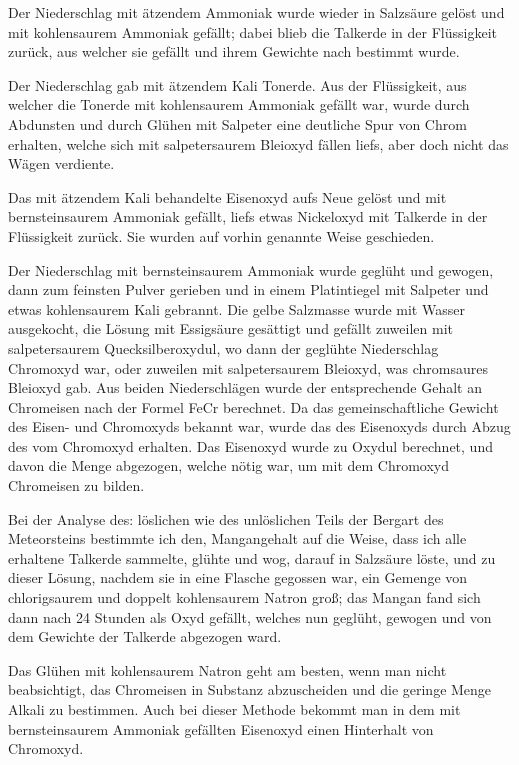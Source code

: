 \documentclass[a4paper, 11pt, oneside]{article}
\begin{document}
Der Niederschlag mit ätzendem Ammoniak wurde wieder in Salzsäure gelöst und mit kohlensaurem Ammoniak gefällt; dabei blieb die Talkerde in der Flüssigkeit zurück, aus welcher sie gefällt und ihrem Gewichte nach bestimmt wurde.

Der Niederschlag gab mit ätzendem Kali Tonerde. Aus der Flüssigkeit, aus welcher die Tonerde mit kohlensaurem Ammoniak gefällt war, wurde durch Abdunsten und durch Glühen mit Salpeter eine deutliche Spur von Chrom erhalten, welche sich mit salpetersaurem Bleioxyd fällen liefs, aber doch nicht das Wägen verdiente.

Das mit ätzendem Kali behandelte Eisenoxyd aufs Neue gelöst und mit bernsteinsaurem Ammoniak gefällt, liefs etwas Nickeloxyd mit Talkerde in der Flüssigkeit zurück. Sie wurden auf vorhin genannte Weise geschieden.

Der Niederschlag mit bernsteinsaurem Ammoniak wurde geglüht und gewogen, dann zum feinsten Pulver gerieben und in einem Platintiegel mit Salpeter und etwas kohlensaurem Kali gebrannt. Die gelbe Salzmasse wurde mit Wasser ausgekocht, die Lösung mit Essigsäure gesättigt und gefällt zuweilen mit salpetersaurem Quecksilberoxydul, wo dann der geglühte Niederschlag Chromoxyd war, oder zuweilen mit salpetersaurem Bleioxyd, was chromsaures Bleioxyd gab. Aus beiden Niederschlägen wurde der entsprechende Gehalt an Chromeisen nach der Formel FeCr berechnet. Da das gemeinschaftliche Gewicht des Eisen- und Chromoxyds bekannt war, wurde das des Eisenoxyds durch Abzug des vom Chromoxyd erhalten. Das Eisenoxyd wurde zu Oxydul berechnet, und davon die Menge abgezogen, welche nötig war, um mit dem Chromoxyd Chromeisen zu bilden.

Bei der Analyse des: löslichen wie des unlöslichen Teils der Bergart des Meteorsteins bestimmte ich den, Mangangehalt auf die Weise, dass ich alle erhaltene Talkerde sammelte, glühte und wog, darauf in Salzsäure löste, und zu dieser Lösung, nachdem sie in eine Flasche gegossen war, ein Gemenge von chlorigsaurem und doppelt kohlensaurem Natron groß; das Mangan fand sich dann nach 24 Stunden als Oxyd gefällt, welches nun geglüht, gewogen und von dem Gewichte der Talkerde abgezogen ward.

Das Glühen mit kohlensaurem Natron geht am besten, wenn man nicht beabsichtigt, das Chromeisen in Substanz abzuscheiden und die geringe Menge Alkali zu bestimmen. Auch bei dieser Methode bekommt man in dem mit bernsteinsaurem Ammoniak gefällten Eisenoxyd einen Hinterhalt von Chromoxyd.
\end{document}
